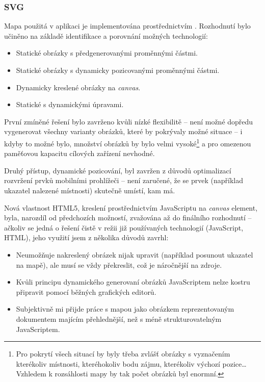 \subsubsection{SVG}
Mapa použitá v aplikaci je implementována prostřednictvím . Rozhodnutí bylo učiněno na základě identifikace a porovnání možných technologií:
\begin{itemize}
 \item Statické obrázky s předgenerovanými proměnnými částmi.
 \item Statické obrázky s dynamicky pozicovanými proměnnými částmi.
 \item Dynamicky kreslené obrázky na \textit{canvas}.
 \item Statické  s dynamickými úpravami.
\end{itemize}

První zmíněné řešení bylo zavrženo kvůli nízké flexibilitě -- není možné dopředu vygenerovat všechny varianty obrázků, které by pokrývaly možné situace -- i kdyby to možné bylo, množství obrázků by bylo velmi vysoké\footnote{Pro pokrytí všech situací by byly třeba zvlášť obrázky s vyznačením kterékoliv místnosti, kteréhokoliv bodu zájmu, kterékoliv výchozí pozice\dots Vzhledem k rozsáhlosti mapy by tak počet obrázků byl enormní.} a pro omezenou paměťovou kapacitu cílových zařízení nevhodné.

Druhý přístup, dynamické pozicování, byl zavržen z důvodů optimalizací rozvržení prvků mobilními prohlížeči -- není zaručené, že se prvek (například ukazatel nalezené místnosti) skutečně umístí, kam má.

Nová vlastnost HTML5, kreslení prostřednictvím JavaScriptu na \textit{canvas} element, byla, narozdíl od předchozích možností, zvažována až do finálního rozhodnutí -- ačkoliv se jedná o řešení čistě v režii již používaných technologií (JavaScript, HTML), jeho využití jsem z několika důvodů zavrhl:
\begin{itemize}
 \item Neumožňuje nakreslený obrázek nijak upravit (například posunout ukazatel na mapě), ale musí se vždy překreslit, což je náročnější na zdroje.
 \item Kvůli principu dynamického generovaní obrázků JavaScriptem nelze kostru připravit pomocí běžných grafických editorů.
 \item Subjektivně mi přijde práce s mapou jako  obrázkem reprezentovaným  dokumentem majícím  přehlednější, než s méně strukturovatelným JavaScriptem.
\end{itemize}

